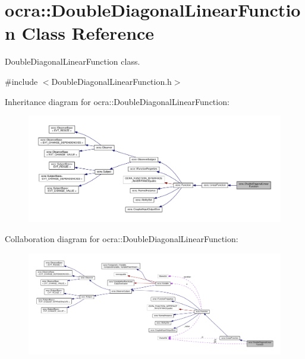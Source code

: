 \hypertarget{classocra_1_1DoubleDiagonalLinearFunction}{}\section{ocra\+:\+:Double\+Diagonal\+Linear\+Function Class Reference}
\label{classocra_1_1DoubleDiagonalLinearFunction}


Double\+Diagonal\+Linear\+Function class.  




{\ttfamily \#include $<$Double\+Diagonal\+Linear\+Function.\+h$>$}



Inheritance diagram for ocra\+:\+:Double\+Diagonal\+Linear\+Function\+:
\nopagebreak
\begin{figure}[H]
\begin{center}
\leavevmode
\includegraphics[width=350pt]{dd/d2b/classocra_1_1DoubleDiagonalLinearFunction__inherit__graph}
\end{center}
\end{figure}


Collaboration diagram for ocra\+:\+:Double\+Diagonal\+Linear\+Function\+:
\nopagebreak
\begin{figure}[H]
\begin{center}
\leavevmode
\includegraphics[width=350pt]{d8/d92/classocra_1_1DoubleDiagonalLinearFunction__coll__graph}
\end{center}
\end{figure}
